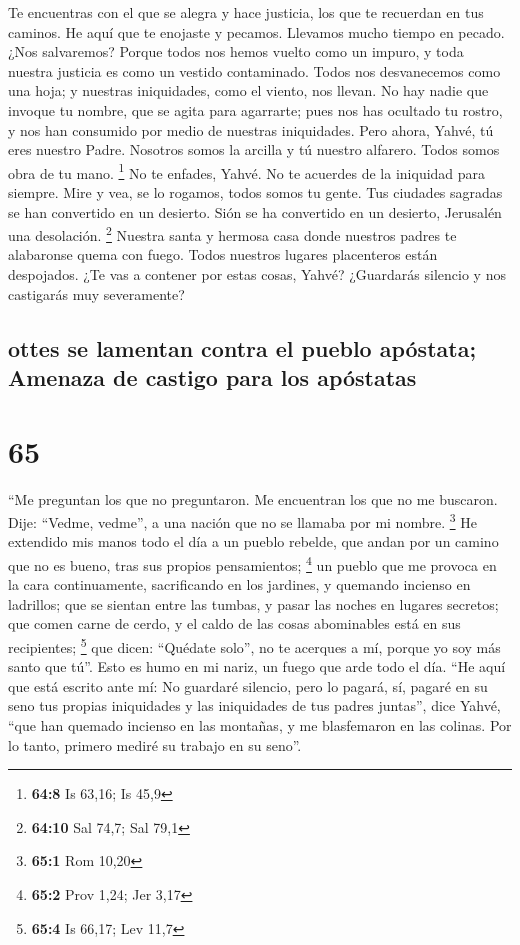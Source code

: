  Te encuentras con el que se alegra y hace justicia, los
que te recuerdan en tus caminos. He aquí que te enojaste y pecamos.
Llevamos mucho tiempo en pecado. ¿Nos salvaremos?  Porque
todos nos hemos vuelto como un impuro, y toda nuestra justicia es como
un vestido contaminado. Todos nos desvanecemos como una hoja; y nuestras
iniquidades, como el viento, nos llevan.  No hay nadie que
invoque tu nombre, que se agita para agarrarte; pues nos has ocultado tu
rostro, y nos han consumido por medio de nuestras iniquidades.
 Pero ahora, Yahvé, tú eres nuestro Padre. Nosotros somos
la arcilla y tú nuestro alfarero. Todos somos obra de tu mano.
\footnote{\textbf{64:8} Is 63,16; Is 45,9}  No te enfades,
Yahvé. No te acuerdes de la iniquidad para siempre. Mire y vea, se lo
rogamos, todos somos tu gente.  Tus ciudades sagradas se
han convertido en un desierto. Sión se ha convertido en un desierto,
Jerusalén una desolación. \footnote{\textbf{64:10} Sal 74,7; Sal 79,1}
 Nuestra santa y hermosa casa donde nuestros padres te
alabaronse quema con fuego. Todos nuestros lugares placenteros están
despojados.  ¿Te vas a contener por estas cosas, Yahvé?
¿Guardarás silencio y nos castigarás muy severamente?

\hypertarget{ottes-se-lamentan-contra-el-pueblo-apuxf3stata-amenaza-de-castigo-para-los-apuxf3statas}{%
\subsection{ottes se lamentan contra el pueblo apóstata; Amenaza de
castigo para los
apóstatas}\label{ottes-se-lamentan-contra-el-pueblo-apuxf3stata-amenaza-de-castigo-para-los-apuxf3statas}}

\hypertarget{section-64}{%
\section{65}\label{section-64}}

 ``Me preguntan los que no preguntaron. Me encuentran los
que no me buscaron. Dije: ``Vedme, vedme'', a una nación que no se
llamaba por mi nombre. \footnote{\textbf{65:1} Rom 10,20} 
He extendido mis manos todo el día a un pueblo rebelde, que andan por un
camino que no es bueno, tras sus propios pensamientos; \footnote{\textbf{65:2}
  Prov 1,24; Jer 3,17}  un pueblo que me provoca en la
cara continuamente, sacrificando en los jardines, y quemando incienso en
ladrillos;  que se sientan entre las tumbas, y pasar las
noches en lugares secretos; que comen carne de cerdo, y el caldo de las
cosas abominables está en sus recipientes; \footnote{\textbf{65:4} Is
  66,17; Lev 11,7}  que dicen: ``Quédate solo'', no te
acerques a mí, porque yo soy más santo que tú''. Esto es humo en mi
nariz, un fuego que arde todo el día.  ``He aquí que está
escrito ante mí: No guardaré silencio, pero lo pagará, sí, pagaré en su
seno  tus propias iniquidades y las iniquidades de tus
padres juntas'', dice Yahvé, ``que han quemado incienso en las montañas,
y me blasfemaron en las colinas. Por lo tanto, primero mediré su trabajo
en su seno''.

